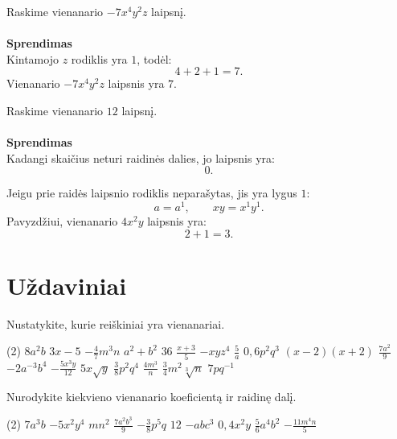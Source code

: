 \documentclass[11pt,a4paper]{scrartcl}
\begin{document}
\begin{example}
Raskime vienanario $-7x^4y^2z$ laipsnį.\\ \\
\textbf{Sprendimas}\\
Kintamojo $z$ rodiklis yra $1$, todėl:
\[
4+2+1=7.
\]
Vienanario $-7x^4y^2z$ laipsnis yra $7$.
\end{example}

\begin{example}
Raskime vienanario $12$ laipsnį. \\ \\
\textbf{Sprendimas}\\ 
Kadangi skaičius neturi raidinės dalies, jo laipsnis yra:
\[
0.
\]
\end{example}

\begin{remark}
Jeigu prie raidės laipsnio rodiklis neparašytas, jis yra lygus $1$:
\[
a=a^1, \qquad xy=x^1y^1.
\]
Pavyzdžiui, vienanario $4x^2y$ laipsnis yra:
\[
2+1=3.
\]
\end{remark}
\newpage
\section{Uždaviniai}

\begin{problem}
Nustatykite, kurie reiškiniai yra vienanariai.

\begin{tasks}[label={(\arabic*)}, label-offset=0.9em](2)
    \task $8a^2b$
    \task $3x-5$
    \task $-\frac{4}{7}m^3n$
    \task $a^2+b^2$
    \task $36$
    \task $\frac{x+3}{5}$
    \task $-xyz^4$
    \task $\frac{5}{a}$
    \task $0,6p^2q^3$
    \task $(x-2)(x+2)$
    \task $\frac{7a^2}{9}$
    \task $-2a^{-3}b^4$
    \task $-\frac{5x^3y}{12}$
    \task $5x\sqrt{y}$
    \task $\frac{3}{8}p^2q^4$
    \task $\frac{4m^3}{n}$
    \task $\frac{3}{4}m^2\sqrt[3]{n}$
    \task $7pq^{-1}$
\end{tasks}
\end{problem}

\begin{problem}
Nurodykite kiekvieno vienanario koeficientą ir raidinę dalį.

\begin{tasks}[label={(\arabic*)}, label-offset=0.9em](2)
    \task $7a^3b$
    \task $-5x^2y^4$
    \task $mn^2$
    \task $\frac{7a^2b^3}{9}$
    \task $-\frac{3}{8}p^5q$
    \task $12$
    \task $-abc^3$
    \task $0,4x^2y$
    \task $\frac{5}{6}a^4b^2$
    \task $-\frac{11m^4n}{5}$
\end{tasks}
\end{problem}
\end{document}
